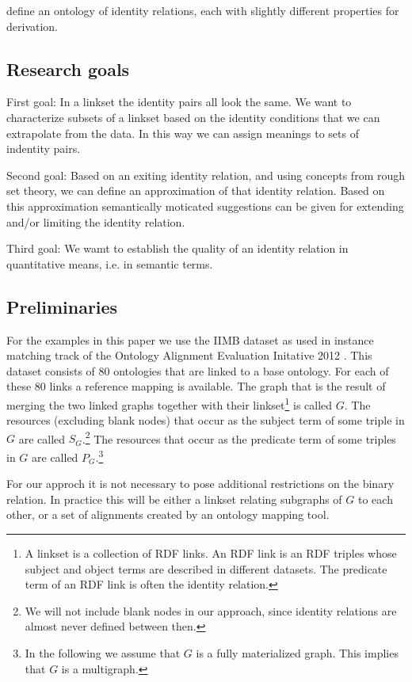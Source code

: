 \documentclass[letterpaper]{article}
\begin{document}
\cite{mccusker_mcguinness_2010} define an ontology of identity relations, each with slightly different properties for derivation.

\subsection{Research goals}

First goal: In a linkset the identity pairs all look the same. We want to characterize subsets of a linkset based on the identity conditions that we can extrapolate from the data. In this way we can assign meanings to sets of indentity pairs.

Second goal: Based on an exiting identity relation, and using concepts from rough set theory, we can define an approximation of that identity relation. Based on this approximation semantically moticated suggestions can be given for extending and/or limiting the identity relation.

Third goal: We wamt to establish the quality of an identity relation in quantitative means, i.e. in semantic terms.

\subsection{Preliminaries}

For the examples in this paper we use the IIMB dataset as used in instance matching track of the Ontology Alignment Evaluation Initative 2012 \cite{oaei_2012}. This dataset consists of 80 ontologies that are linked to a base ontology. For each of these 80 links a reference mapping is available. The graph that is the result of merging the two linked graphs together with their linkset\footnote{A linkset is a collection of RDF links. An RDF link is an RDF triples whose subject and object terms are described in different datasets. \cite{void_2011} The predicate term of an RDF link is often the identity relation.} is called $G$. The resources (excluding blank nodes) that occur as the subject term of some triple in $G$ are called $S_G$.\footnote{We will not include blank nodes in our approach, since identity relations are almost never defined between then.} The resources that occur as the predicate term of some triples in $G$ are called $P_G$.\footnote{In the following we assume that $G$ is a fully materialized graph. This implies that $G$ is a multigraph.}

For our approch it is not necessary to pose additional restrictions on the binary relation. In practice this will be either a linkset relating subgraphs of $G$ to each other, or a set of alignments created by an ontology mapping tool.
\end{document}
